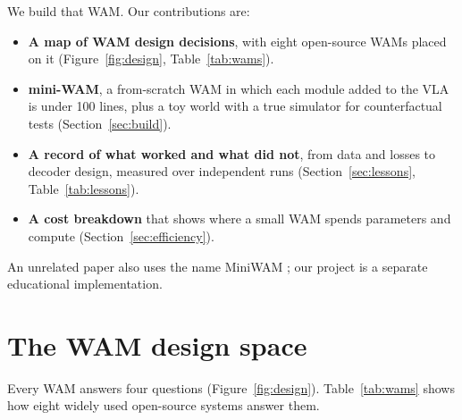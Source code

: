 \documentclass[11pt]{article}
\begin{document}
We build that WAM. Our contributions are:
\begin{itemize}\itemsep0pt
  \item \textbf{A map of WAM design decisions}, with eight open-source WAMs placed on it (Figure~\ref{fig:design}, Table~\ref{tab:wams}).
  \item \textbf{mini-WAM}, a from-scratch WAM in which each module added to the VLA is under 100 lines, plus a toy world with a true simulator for counterfactual tests (Section~\ref{sec:build}).
  \item \textbf{A record of what worked and what did not}, from data and losses to decoder design, measured over independent runs (Section~\ref{sec:lessons}, Table~\ref{tab:lessons}).
  \item \textbf{A cost breakdown} that shows where a small WAM spends parameters and compute (Section~\ref{sec:efficiency}).
\end{itemize}
An unrelated paper also uses the name MiniWAM \citep{chen2026miniwam}; our project is a separate educational implementation.

\section{The WAM design space}
\label{sec:design}

Every WAM answers four questions (Figure~\ref{fig:design}). Table~\ref{tab:wams} shows how eight widely used open-source systems answer them.
\end{document}
